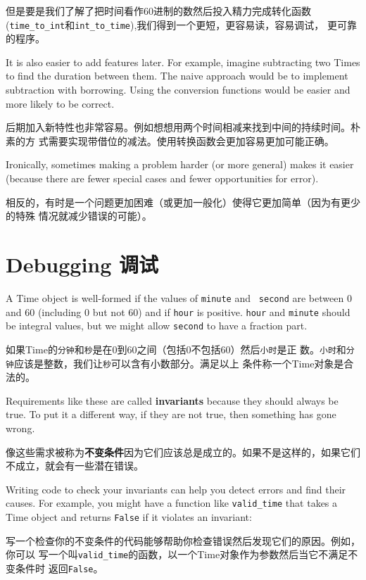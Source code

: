 \documentclass[10pt]{book}
\begin{document}
\begin{CJK}{UTF8}{gbsn}
但是要是我们了解了把时间看作60进制的数然后投入精力完成转化函数
(\verb"time_to_int"和\verb"int_to_time"),我们得到一个更短，更容易读，容易调试，
更可靠的程序。

It is also easier to add features later.  For example, imagine
subtracting two Times to find the duration between them.  The
naive approach would be to implement subtraction with borrowing.
Using the conversion functions would be easier and more likely to be
correct.

后期加入新特性也非常容易。例如想想用两个时间相减来找到中间的持续时间。朴素的方
式需要实现带借位的减法。使用转换函数会更加容易更加可能正确。

Ironically, sometimes making a problem harder (or more general) makes it
easier (because there are fewer special cases and fewer opportunities
for error).

相反的，有时是一个问题更加困难（或更加一般化）使得它更加简单（因为有更少的特殊
情况就减少错误的可能）。


\section{Debugging 调试}

A Time object is well-formed if the values of {\tt minute} and {\tt
second} are between 0 and 60 (including 0 but not 60) and if 
{\tt hour} is positive.  {\tt hour} and {\tt minute} should be
integral values, but we might allow {\tt second} to have a
fraction part.

如果Time的{\tt 分钟}和{\tt 秒}是在0到60之间（包括0不包括60）然后{\tt 小时}是正
数。{\tt 小时}和{\tt 分钟}应该是整数，我们让{\tt 秒}可以含有小数部分。满足以上
条件称一个Time对象是合法的。

Requirements like these are called {\bf invariants} because
they should always be true.  To put it a different way, if they
are not true, then something has gone wrong.

像这些需求被称为{\bf 不变条件}因为它们应该总是成立的。如果不是这样的，如果它们
不成立，就会有一些潜在错误。

Writing code to check your invariants can help you detect errors
and find their causes.  For example, you might have a function
like \verb"valid_time" that takes a Time object and returns
{\tt False} if it violates an invariant:

写一个检查你的不变条件的代码能够帮助你检查错误然后发现它们的原因。例如，你可以
写一个叫\verb"valid_time"的函数，以一个Time对象作为参数然后当它不满足不变条件时
返回{\tt False}。


\end{CJK}
\end{document}
